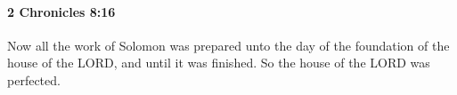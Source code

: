 
		\paragraph{2 Chronicles 8:16} %
			\label{2CHRONICLES-8-16}

			Now all the work of Solomon was prepared unto the day of the foundation of the house of the LORD, and until it was finished. So the house of the LORD was perfected.


